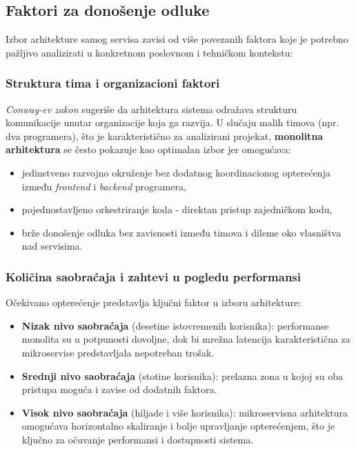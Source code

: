 \documentclass[12pt]{article}
\begin{document}
    \subsection{Faktori za donošenje odluke}

    Izbor arhitekture samog servisa zavisi od više povezanih faktora koje je potrebno pažljivo 
    analizirati u konkretnom poslovnom i tehničkom kontekstu:

    \subsubsection*{Struktura tima i organizacioni faktori}

    \textit{Conway-ev zakon} sugeriše da arhitektura sistema odražava strukturu komunikacije 
    unutar organizacije koja ga razvija. U slučaju malih timova (npr. dva programera), 
    što je karakteristično za analizirani projekat, \textbf{monolitna arhitektura} se često 
    pokazuje kao optimalan izbor jer omogućava:
    \begin{itemize}
        \item jedinstveno razvojno okruženje bez dodatnog koordinacionog opterećenja između \textit{frontend} i \textit{backend} programera,
        \item pojednostavljeno orkestriranje koda - direktan pristup zajedničkom kodu,
        \item brže donošenje odluka bez zavisnosti između timova i dileme oko vlasništva nad servisima.
    \end{itemize}

    \subsubsection*{Količina saobraćaja i zahtevi u pogledu performansi}

    Očekivano opterećenje predstavlja ključni faktor u izboru arhitekture:
    \begin{itemize}
        \item \textbf{Nizak nivo saobraćaja} (desetine istovremenih korisnika): performanse monolita su 
        u potpunosti dovoljne, dok bi mrežna latencija karakteristična za mikroservise predstavljala 
        nepotreban trošak.
        \item \textbf{Srednji nivo saobraćaja} (stotine korisnika): prelazna zona u kojoj su oba 
        pristupa moguća i zavise od dodatnih faktora.
        \item \textbf{Visok nivo saobraćaja} (hiljade i više korisnika): mikroservisna arhitektura 
        omogućava horizontalno skaliranje i bolje upravljanje opterećenjem, što je ključno za 
        očuvanje performansi i dostupnosti sistema.
    \end{itemize}
\end{document}

